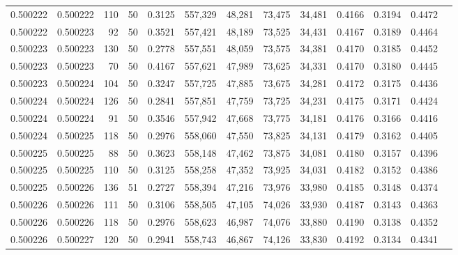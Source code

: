 \begin{tabular}{rrrrrrrrrrrrr}
0.500222 & 0.500222 &   110 &  50 &                                     0.3125 & 557,329 &  48,281 &  73,475 &  34,481 & 0.4166 & 0.3194 & 0.4472 \\
0.500222 & 0.500223 &    92 &  50 &                                     0.3521 & 557,421 &  48,189 &  73,525 &  34,431 & 0.4167 & 0.3189 & 0.4464 \\
0.500223 & 0.500223 &   130 &  50 &                                     0.2778 & 557,551 &  48,059 &  73,575 &  34,381 & 0.4170 & 0.3185 & 0.4452 \\
0.500223 & 0.500223 &    70 &  50 &                                     0.4167 & 557,621 &  47,989 &  73,625 &  34,331 & 0.4170 & 0.3180 & 0.4445 \\
0.500223 & 0.500224 &   104 &  50 &                                     0.3247 & 557,725 &  47,885 &  73,675 &  34,281 & 0.4172 & 0.3175 & 0.4436 \\
0.500224 & 0.500224 &   126 &  50 &                                     0.2841 & 557,851 &  47,759 &  73,725 &  34,231 & 0.4175 & 0.3171 & 0.4424 \\
0.500224 & 0.500224 &    91 &  50 &                                     0.3546 & 557,942 &  47,668 &  73,775 &  34,181 & 0.4176 & 0.3166 & 0.4416 \\
0.500224 & 0.500225 &   118 &  50 &                                     0.2976 & 558,060 &  47,550 &  73,825 &  34,131 & 0.4179 & 0.3162 & 0.4405 \\
0.500225 & 0.500225 &    88 &  50 &                                     0.3623 & 558,148 &  47,462 &  73,875 &  34,081 & 0.4180 & 0.3157 & 0.4396 \\
0.500225 & 0.500225 &   110 &  50 &                                     0.3125 & 558,258 &  47,352 &  73,925 &  34,031 & 0.4182 & 0.3152 & 0.4386 \\
0.500225 & 0.500226 &   136 &  51 &                                     0.2727 & 558,394 &  47,216 &  73,976 &  33,980 & 0.4185 & 0.3148 & 0.4374 \\
0.500226 & 0.500226 &   111 &  50 &                                     0.3106 & 558,505 &  47,105 &  74,026 &  33,930 & 0.4187 & 0.3143 & 0.4363 \\
0.500226 & 0.500226 &   118 &  50 &                                     0.2976 & 558,623 &  46,987 &  74,076 &  33,880 & 0.4190 & 0.3138 & 0.4352 \\
0.500226 & 0.500227 &   120 &  50 &                                     0.2941 & 558,743 &  46,867 &  74,126 &  33,830 & 0.4192 & 0.3134 & 0.4341 \\

\end{tabular}
